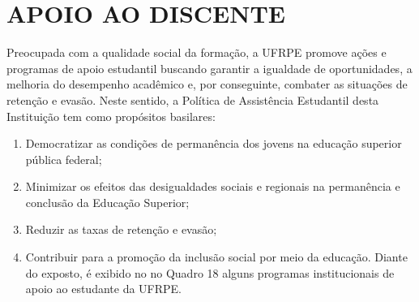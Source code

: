 \documentclass[
	12pt,				%
	openright,			%
  oneside,     %
	a4paper,			%
	chapter=TITLE,		%
	english,			%
	french,				%
	spanish,			%
	brazil				%
	]{abntex2}
\begin{document}
\chapter{APOIO AO DISCENTE}
\label{cap_apoio_ao_discente}

Preocupada com a qualidade social da formação, a UFRPE promove ações e programas de apoio estudantil buscando garantir a igualdade de oportunidades, a melhoria do desempenho acadêmico e, por conseguinte, combater as situações de retenção e evasão. Neste sentido, a Política de Assistência Estudantil desta Instituição tem como propósitos basilares:

\begin{enumerate}
    \item Democratizar as condições de permanência dos jovens na educação superior pública federal;
    \item Minimizar os efeitos das desigualdades sociais e regionais na permanência e conclusão da Educação Superior;
    \item Reduzir as taxas de retenção e evasão;
    \item Contribuir para a promoção da inclusão social por meio da educação.
	Diante do exposto, é exibido no no Quadro 18 alguns programas institucionais de apoio ao estudante da UFRPE.
\end{enumerate}
\end{document}
